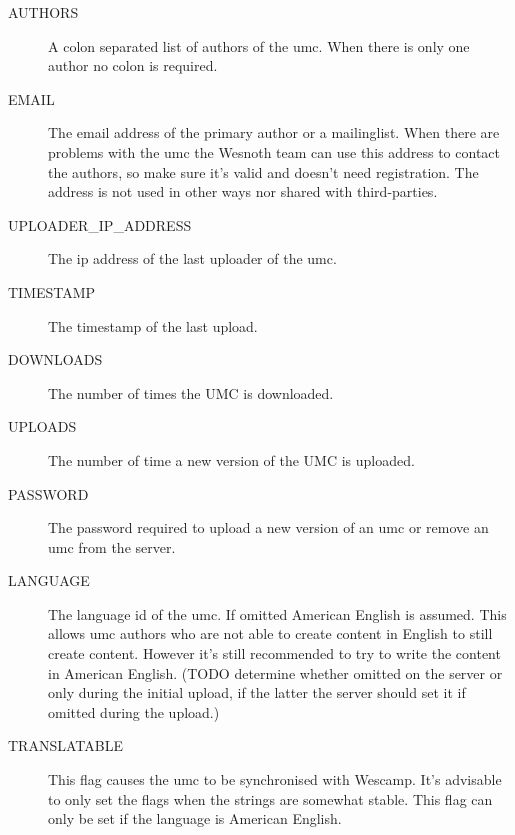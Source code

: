 \begin{description}
\item[AUTHORS]
	A colon separated list of authors of the umc. When there is only one
	author no colon is required.

\item[EMAIL]
	The email address of the primary author or a mailinglist. When there are
	problems with the umc the Wesnoth team can use this address to contact
	the authors, so make sure it's valid and doesn't need registration.
	The address is not used in other ways nor shared with third-parties.

\item[UPLOADER\_IP\_ADDRESS]
	The ip address of the last uploader of the umc.

\item[TIMESTAMP]
	The timestamp of the last upload.

\item[DOWNLOADS]
	The number of times the UMC is downloaded.

\item[UPLOADS]
	The number of time a new version of the UMC is uploaded.

\item[PASSWORD]
	The password required to upload a new version of an umc or remove an umc
	from the server.

\item[LANGUAGE]
	The language id of the umc. If omitted American English is assumed.
	This allows umc authors who are not able to create content in English to
	still create content. However it's still recommended to try to write the
	content in American English. (TODO determine whether omitted on the
	server or only during the initial upload, if the latter the server
	should set it if omitted during the upload.)

\item[TRANSLATABLE]
	This flag causes the umc to be synchronised with Wescamp. It's advisable
	to only set the flags when the strings are somewhat stable. This flag
	can only be set if the language is American English.
\end{description}

